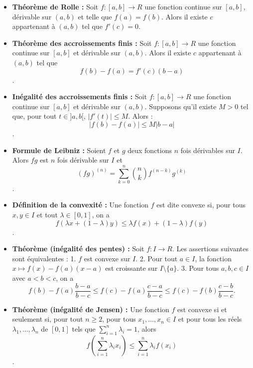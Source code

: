 \documentclass{article}
\begin{document}
\begin{itemize}[label=$\ast$]
	\item \textbf{Théorème de Rolle :} Soit \( f : [a, b] \rightarrow R \) une fonction continue sur \([a, b]\), dérivable sur \((a, b)\) et telle que \(f(a) = f(b)\). Alors il existe \(c\) appartenant à \((a, b)\) tel que \(f'(c) = 0\).

	\item \textbf{Théorème des accroissements finis :} Soit \( f : [a, b] \rightarrow R \) une fonction continue sur \([a, b]\) et dérivable sur \((a, b)\). Alors il existe \( c \) appartenant à \((a, b)\) tel que
\[ f(b) - f(a) = f'(c)(b - a) \].

	\item \textbf{Inégalité des accroissements finis :} Soit \( f : [a, b] \rightarrow R \) une fonction continue sur \([a, b]\) et dérivable sur \((a, b)\). Supposons qu'il existe \( M > 0 \) tel que, pour tout \( t \in ]a, b[ \), \( |f'(t)| \leq M \). Alors :
\[ |f(b) - f(a)| \leq M|b - a| \].

	\item \textbf{Formule de Leibniz :} Soient \( f \) et \( g \) deux fonctions \( n \) fois dérivables sur \( I \). Alors \( fg \) est \( n \) fois dérivable sur \( I \) et
\[ (fg)^{(n)} = \sum_{k=0}^{n} \binom{n}{k} f^{(n-k)}g^{(k)} \].

	\item \textbf{Définition de la convexité :} Une fonction \( f \) est dite convexe si, pour tous \( x, y \in I \) et tout \( \lambda \in [0, 1] \), on a
\[ f(\lambda x + (1-\lambda)y) \leq \lambda f(x) + (1-\lambda)f(y) \].

	\item \textbf{Théorème (inégalité des pentes) :} Soit \( f : I \rightarrow R \). Les assertions suivantes sont équivalentes :
1. \( f \) est convexe sur \( I \).
2. Pour tout \( a \in I \), la fonction \( x \mapsto f(x) - f(a)(x - a) \) est croissante sur \( I \setminus \{a\} \).
3. Pour tous \( a, b, c \in I \) avec \( a < b < c \), on a
   \[ f(b) - f(a) \frac{b - a}{b - c} \leq f(c) - f(a) \frac{c - a}{b - c} \leq f(c) - f(b) \frac{c - b}{b - c}. \]

	\item \textbf{Théorème (inégalité de Jensen) :} Une fonction \( f \) est convexe si et seulement si, pour tout \( n \geq 2 \), pour tous \( x_1, \ldots, x_n \in I \) et pour tous les réels \( \lambda_1, \ldots, \lambda_n \) de \( [0, 1] \) tels que \( \sum_{i=1}^{n} \lambda_i = 1 \), alors
\[ f\left(\sum_{i=1}^{n} \lambda_i x_i\right) \leq \sum_{i=1}^{n} \lambda_i f(x_i) \].





\end{itemize}
\end{document}
